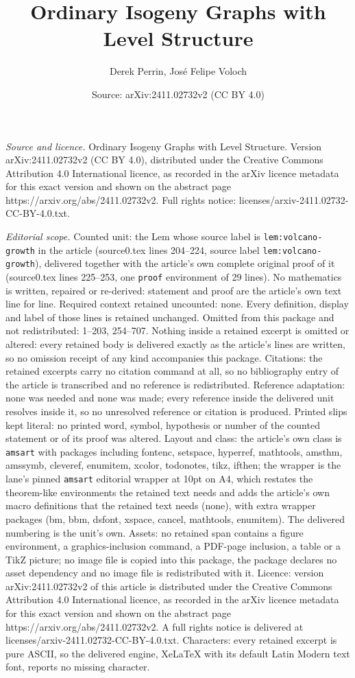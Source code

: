 \documentclass[10pt,a4paper]{amsart}
\title[Ordinary Isogeny Graphs with Level Structure]{Ordinary Isogeny Graphs with Level Structure}
\author{Derek Perrin, Jos\'e Felipe Voloch}
\date{Source: arXiv:2411.02732v2 (CC BY 4.0)}
\begin{document}
\maketitle

\noindent\emph{Source and licence.} Ordinary Isogeny Graphs with Level Structure. Version arXiv:2411.02732v2 (CC BY 4.0), distributed under the Creative Commons Attribution 4.0 International licence, as recorded in the arXiv licence metadata for this exact version and shown on the abstract page https://arxiv.org/abs/2411.02732v2. Full rights notice: licenses/arxiv-2411.02732-CC-BY-4.0.txt.\par\smallskip

\noindent\textit{Editorial scope.} Counted unit: the Lem whose source label is \texttt{lem:volcano-growth} in the article (source0.tex lines 204--224, source label \texttt{lem:volcano-growth}), delivered together with the article's own complete original proof of it (source0.tex lines 225--253, one \texttt{proof} environment of 29 lines). No mathematics is written, repaired or re-derived: statement and proof are the article's own text line for line. Required context retained uncounted: none. Every definition, display and label of those lines is retained unchanged. Omitted from this package and not redistributed: 1--203, 254--707. Nothing inside a retained excerpt is omitted or altered: every retained body is delivered exactly as the article's lines are written, so no omission receipt of any kind accompanies this package. Citations: the retained excerpts carry no citation command at all, so no bibliography entry of the article is transcribed and no reference is redistributed. Reference adaptation: none was needed and none was made; every reference inside the delivered unit resolves inside it, so no unresolved reference or citation is produced. Printed slips kept literal: no printed word, symbol, hypothesis or number of the counted statement or of its proof was altered. Layout and class: the article's own class is \texttt{amsart} with packages including fontenc, setspace, hyperref, mathtools, amsthm, amssymb, cleveref, enumitem, xcolor, todonotes, tikz, ifthen; the wrapper is the lane's pinned \texttt{amsart} editorial wrapper at 10pt on A4, which restates the theorem-like environments the retained text needs and adds the article's own macro definitions that the retained text needs (none), with extra wrapper packages (bm, bbm, dsfont, xspace, cancel, mathtools, enumitem). The delivered numbering is the unit's own. Assets: no retained span contains a figure environment, a graphics-inclusion command, a PDF-page inclusion, a table or a TikZ picture; no image file is copied into this package, the package declares no asset dependency and no image file is redistributed with it. Licence: version arXiv:2411.02732v2 of this article is distributed under the Creative Commons Attribution 4.0 International licence, as recorded in the arXiv licence metadata for this exact version and shown on the abstract page https://arxiv.org/abs/2411.02732v2. A full rights notice is delivered at licenses/arxiv-2411.02732-CC-BY-4.0.txt. Characters: every retained excerpt is pure ASCII, so the delivered engine, XeLaTeX with its default Latin Modern text font, reports no missing character.
\end{document}
